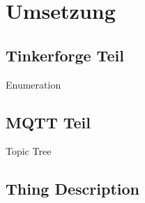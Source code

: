 \chapter{Umsetzung}
\label{chap:umsetzung}

\section{Tinkerforge Teil}
Enumeration

\section{MQTT Teil}
Topic Tree

\section{Thing Description}
